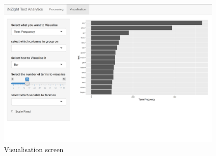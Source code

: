 \documentclass[11pt, a4paper, titlepage]{report}
\begin{document}
\begin{figure}
  \centering \includegraphics[scale=0.35]{visualisation-overview.png}
  \caption{Visualisation screen\label{fig:visualisation-overview}}
\end{figure}
\end{document}
